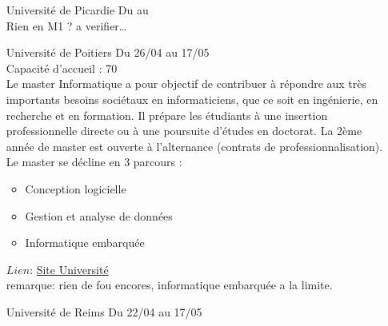 \documentclass[a4paper,11pt]{article}
\newcommand{\e}{\'{e}}
\begin{document}
\begin{enumerate}
                    \begin{itemize}
                        \item Parcours Big Data
                        \item Parcours Systèmes Informatiques pour le Génie de la Logistique Industrielle et des Services (SIGLIS)
                        \item Parcours technologie de l'internet (TI)
                    \end{itemize}
                    $Lien$: \href{https://formation.univ-pau.fr/fr/catalogue/sciences-technologies-sante-STS/master-14/master-informatique-79_1.html}{Site Université}
                    \\ remarque: il essaye d'etre original dommage qu'il ne soit pas interresant, le parcours TI a l'air agr\e able
\\
        \item [\color{LightOrangeHaf}Université de Picardie] Du  au 
        \\ Rien en M1 ? a verifier\ldots
\\
        \item [\color{LightOrangeHaf}Université de Poitiers] Du 26/04 au 17/05
                    \\Capacité d'accueil : 70
                    \\Le master Informatique a pour objectif de contribuer à répondre aux très importants besoins sociétaux en informaticiens, que ce soit en ingénierie, en recherche et en formation.  Il prépare les étudiants à une insertion professionnelle directe ou à une poursuite d'études en doctorat. La 2ème année de master est ouverte à l'alternance (contrats de professionnalisation).  Le master se décline en 3 parcours :
                    \begin{itemize}
                        \item Conception logicielle
                        \item Gestion et analyse de données
                        \item Informatique embarquée
                    \end{itemize}
                    $Lien$: \href{http://formations.univ-poitiers.fr/fr/index/master-XB/master-XB/master-informatique-JAJEEY0P.html}{Site Université}
                    \\ remarque: rien de fou encores, informatique embarquée a la limite.
\\
        \item [\color{LightOrangeHaf}Université de Reims] Du 22/04 au 17/05

\end{enumerate}
\end{document}
